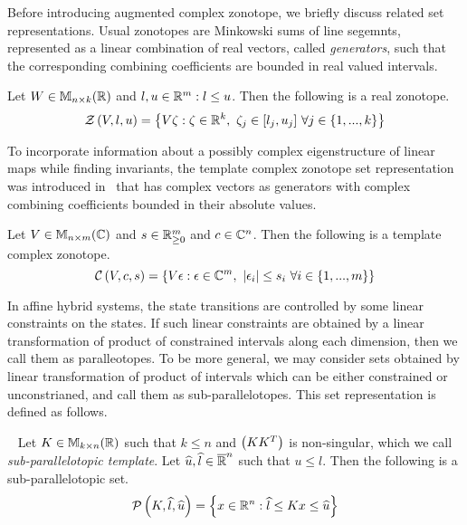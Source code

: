 Before introducing augmented complex zonotope, we briefly discuss
related set representations.  Usual zonotopes are Minkowski sums of
line segemnts, represented as a linear combination of real vectors,
called \emph{generators}, such that the corresponding combining coefficients
are bounded in real valued intervals.
\begin{definition}
Let $W\in\mathbb{M}_{n\times k}(\mathbb{\mathbb{R}})$ and $l,u\in\mathbb{R}^m: l\leq u$.  Then the
following is a real zonotope.
\begin{equation*}
\mathcal{Z}\left(V,l,u\right) = \left\{V\zeta: \zeta\in\mathbb{R}^k,~\zeta_j\in[l_j,u_j]~\forall j\in \{1,...,k\}\right\}
\end{equation*}
\end{definition}

To incorporate information about a possibly complex eigenstructure of
linear maps while finding invariants,  the template complex zonotope
set representation was introduced in~\cite{todo} that has complex
vectors as generators with complex combining coefficients bounded in
their absolute values.
\begin{definition}
Let $V\in\mathbb{M}_{n\times m}(\mathbb{\mathbb{C}})$ and $s\in\mathbb{R}^m_{\geq 0}$ and
$c\in\mathbb{C}^n$.  Then the following is a template complex zonotope.
\begin{equation*}
\mathcal{C}\left(V,c,s\right) =
\left\{V\epsilon:\epsilon\in\mathbb{C}^m,~\left|\epsilon_i\right|\leq s_i~\forall
i\in\{1,...,m\}\right\}
\end{equation*}
\end{definition}

In affine hybrid systems, the state transitions are controlled by some
linear constraints on the states.  If such linear constraints are
obtained by a linear transformation of product of constrained
intervals along each dimension, then we call them as paralleotopes.
To be more general, we may consider sets obtained by linear
transformation of product of intervals which can be either constrained
or unconstrianed, and call them as sub-parallelotopes.  This set
representation is defined as follows.
%
\begin{definition}~\label{defn:sub-parallelotope} Let
  $K\in\mathbb{M}_{k\times n}(\mathbb{R})$ such that $k\leq n$ and $\left(KK^T\right)$ is
  non-singular, which we call \emph{sub-parallelotopic template}.  Let
  $\widehat{u},\widehat{l}\in\mathbb{\overline{R}}^n$ such that $u\leq l$.  Then the following
  is a sub-parallelotopic set.
\[
\mathcal{P}\left(K,\widehat{l},\widehat{u}\right) = \left\{x\in\mathbb{R}^n: \widehat{l}\leq Kx \leq \widehat{u}\right\}
\]
\end{definition}


